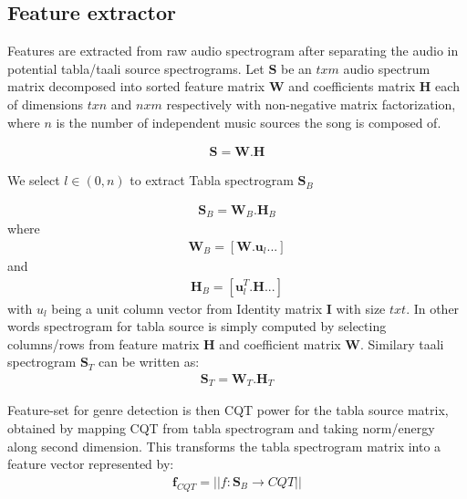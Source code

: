 \documentclass{article}
\begin{document}
\subsection{Feature extractor}
Features are extracted from raw audio spectrogram after separating the audio in potential tabla/taali source spectrograms. Let $\boldsymbol{S}$ be an $txm$ audio spectrum matrix decomposed into sorted feature matrix $\boldsymbol{W}$ and coefficients matrix $\boldsymbol{H}$ each of dimensions $txn$ and $nxm$ respectively with non-negative matrix factorization, where $n$ is the number of independent music sources the song is composed of.

\begin{align}\label{eq:eq1}
\boldsymbol{S} = \boldsymbol{W}.\boldsymbol{H}
\end{align}

We select $l \in (0,n)$ to extract Tabla spectrogram $\boldsymbol{S}_{B}$ 

\begin{align}\label{eq:eq2}
\boldsymbol{S}_{B} = \boldsymbol{W}_{B}.\boldsymbol{H}_{B}
\end{align}
where
\begin{align}\label{eq:eq3}
\boldsymbol{W}_{B} = [\boldsymbol{W}.\boldsymbol{u}_{l} ...]
\end{align}
and 
\begin{align}\label{eq:eq4}
\boldsymbol{H}_{B} = [\boldsymbol{u}_{l}^T.\boldsymbol{H} ...]
\end{align}
with $u_{l}$ being a unit column vector from Identity matrix $\boldsymbol{I}$ with size $txt$. In other words spectrogram for tabla source is simply computed
by selecting columns/rows from feature matrix $\boldsymbol{H}$ and coefficient matrix $\boldsymbol{W}$. Similary taali spectrogram $\boldsymbol{S}_{T}$ can be written as:
\begin{align}\label{eq:eq5}
\boldsymbol{S}_{T} = \boldsymbol{W}_{T}.\boldsymbol{H}_{T}
\end{align}

Feature-set for genre detection is then CQT power for the tabla source matrix, obtained by mapping CQT from tabla spectrogram and taking norm/energy along second dimension. This transforms the tabla spectrogram matrix into a feature vector represented by:
\begin{align}\label{eq:eq6}
\boldsymbol{f}_{CQT} = \lvert \lvert f\colon \boldsymbol{S}_{B}\to CQT \rvert \rvert
\end{align}
\end{document}
